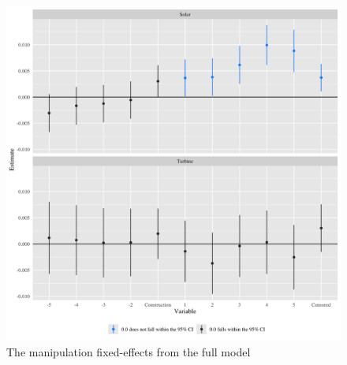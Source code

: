 \documentclass{article}
\begin{document}
\begin{figure}[h]
\centering
\includegraphics[width=0.9\linewidth]
{fixef_manipulation.png} 
\caption{The manipulation fixed-effects from the full model}
\label{fixef_manipulation}
\end{figure}
\end{document}
